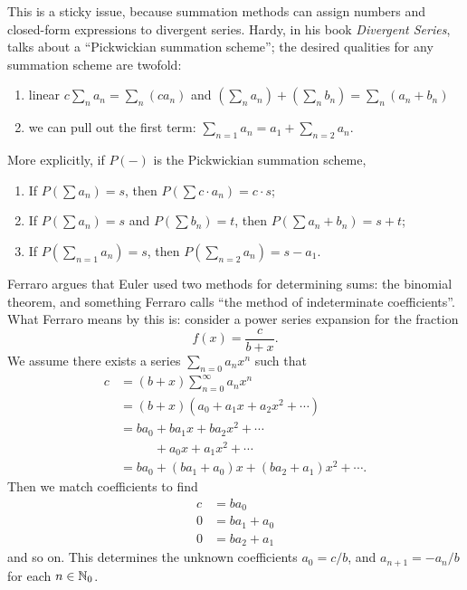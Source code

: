 \M
This is a sticky issue, because summation methods can assign numbers and
closed-form expressions to divergent series. Hardy, in his book
\textit{Divergent Series}, talks about a
``Pickwickian summation scheme''; the desired qualities for any
summation scheme are twofold:
\begin{enumerate}
\item linear $c\sum_{n}a_{n}=\sum_{n}(ca_{n})$ and $(\sum_{n}a_{n})+(\sum_{n}b_{n})=\sum_{n}(a_{n}+b_{n})$
\item we can pull out the first term: $\sum_{n=1}a_{n} = a_{1} + \sum_{n=2}a_{n}$.
\end{enumerate}
More explicitly, if $P(-)$ is the Pickwickian summation scheme,
\begin{enumerate}
\item If $P(\sum a_{n})=s$, then $P(\sum c\cdot a_{n})=c\cdot s$;
\item If $P(\sum a_{n})=s$ and $P(\sum b_{n})=t$, then $P(\sum a_{n} + b_{n})=s+t$;
\item If $P(\sum_{n=1} a_{n})=s$, then $P(\sum_{n=2} a_{n})=s-a_{1}$.
\end{enumerate}

\M
Ferraro argues that Euler used two methods for determining sums: the
binomial theorem, and something Ferraro calls ``the method of
indeterminate coefficients''. What Ferraro means by this is: consider a
power series expansion for the fraction
\begin{equation}
f(x) = \frac{c}{b + x}.
\end{equation}
We assume there exists a series $\sum_{n=0}a_{n}x^{n}$ such that
\begin{subequations}
\begin{align}
c &= (b + x)\sum^{\infty}_{n=0}a_{n}x^{n}\\
&= (b + x)(a_{0} + a_{1}x + a_{2}x^{2} + \cdots)\\
&= ba_{0} + ba_{1}x + ba_{2}x^{2} + \cdots\nonumber\\
&\phantom{= ba_{0}} + a_{0}x + a_{1}x^{2} + \cdots\\
&= ba_{0} + (ba_{1} + a_{0})x + (ba_{2} + a_{1})x^{2} + \cdots.
\end{align}
\end{subequations}
Then we match coefficients to find
\begin{subequations}
\begin{align}
c &= ba_{0}\\
0 &= ba_{1} + a_{0}\\
0 &= ba_{2} + a_{1}
\end{align}
\end{subequations}
and so on. This determines the unknown coefficients $a_{0}=c/b$, and
$a_{n+1}=-a_{n}/b$ for each $n\in\mathbb{N}_{0}$.

